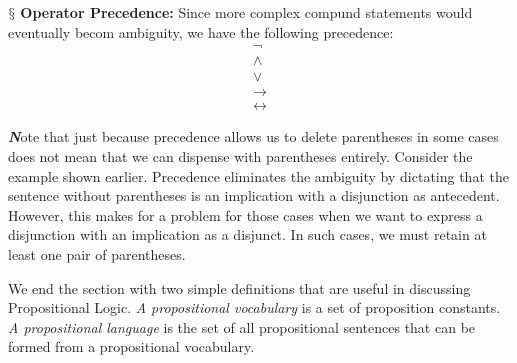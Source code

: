 \documentclass[10pt,a4pape,twocolumn]{article}
\newenvironment{callout}
	{\begin{calloutbox}\color{charcoal}\textbf\textit}
	{\end{calloutbox}}
\newcommand{\newpoint}[1]{\indent$\mathsection$ \textbf{#1}}
\begin{document}
                \newpoint{Operator Precedence:} Since more complex compund statements would eventually becom ambiguity, we have the following precedence:
                \begin{align*}
                        \neg \\
                        \land \\ 
                        \lor \\
                        \rightarrow\\
                        \leftrightarrow
                \end{align*}

                \begin{callout}
                        Note that just because precedence allows us to delete parentheses in some cases does not mean that we can dispense with parentheses entirely. Consider the example shown earlier. Precedence eliminates the ambiguity by dictating that the sentence without parentheses is an implication with a disjunction as antecedent. However, this makes for a problem for those cases when we want to express a disjunction with an implication as a disjunct. In such cases, we must retain at least one pair of parentheses.
                \end{callout}
                We end the section with two simple definitions that are useful in discussing Propositional Logic. \textit{A propositional vocabulary} is a set of proposition constants. \textit{A propositional language} is the set of all propositional sentences that can be formed from a propositional vocabulary.
\end{document}
